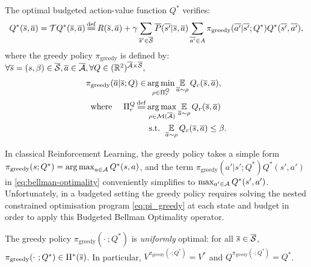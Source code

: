 \documentclass{article}
\begin{document}
\begin{theorem}
\label{thm:bellman-optimality}
The optimal budgeted action-value function $Q^*$ verifies:
\begin{equation}
\label{eq:bellman-optimality}
    Q^{*}(\os, \oa) = \cT Q^{*}(\os, \oa) \eqdef R(\os, \oa) + \gamma \sum_{\os'\in\ocS} \ov{P}(\ov{s'} | \os, \oa)\sum_{\ov{a'}\in A} \pi_\text{greedy}(\ov{a'}|\ov{s'}; Q^*) Q^{*}(\ov{s'}, \ov{a'}),
\end{equation}
where the greedy policy $\pi_\text{greedy}$ is defined by: $\forall \overline{s}=(s,\beta)\in \overline{\mathcal{S}}, \overline{a}\in 
\overline{\mathcal{A}}, \forall Q\in(\mathbb{R}^2)^{\overline{\mathcal{A}}\times\overline{\mathcal{S}}},$
\begin{subequations}
\label{eq:pi_greedy}
\begin{align}
    \pi_\text{greedy}(\oa|\os; Q) \in &\argmin_{\rho\in\Pi_r^Q} \expectedvalueover{\oa\sim\rho}Q_c(\os, \oa), \label{eq:pi_greedy_cost}\\
    \text{where }\quad\Pi_r^Q \eqdef &\argmax_{\rho\in\cM(\ocA)} \expectedvalueover{\oa\sim\rho} Q_r(\os, \oa) \label{eq:pi_greedy_reward}\\
    & \text{ s.t. }  \expectedvalueover{\oa\sim\rho} Q_c(\os, \oa) \leq \beta. \label{eq:pi_greedy_constraint}
\end{align}
\end{subequations}
\end{theorem}

\begin{remark}
\label{rmk:greedy}
In classical Reinforcement Learning, the greedy policy takes a simple form $\pi_\text{greedy}(s; Q^*) = \operatorname*{arg\,max}_{a\in\mathcal{A}} Q^*(s, a)$, and the term $\pi_\text{greedy}(a'|s';Q^*) Q^{*}(s', a')$ in \eqref{eq:bellman-optimality} conveniently simplifies to $\max_{a'\in \mathcal{A}} Q^*(s', a')$. Unfortunately, in a budgeted setting the greedy policy requires solving the nested constrained optimisation program \eqref{eq:pi_greedy} at each state and budget in order to apply this Budgeted Bellman Optimality operator.
\end{remark}

\begin{proposition}
\label{prop:greedy_optimal}
The greedy policy $\pi_\text{greedy}(\cdot~; Q^*)$ is \emph{uniformly} optimal: for all $\overline{s}\in\overline{\mathcal{S}}$, $\pi_\text{greedy}(\cdot~; Q^*)\in\Pi^*(\overline{s})$. In particular, $V^{\pi_\text{greedy}(\cdot; Q^*)} = V^*$ and $Q^{\pi_\text{greedy}(\cdot; Q^*)}= Q^*$.
\end{proposition}
\end{document}
